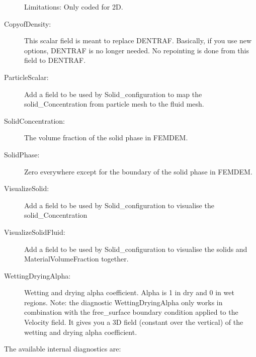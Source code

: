 \begin{description}
Limitations: Only coded for 2D.
\item[CopyofDensity:]This scalar field is meant to replace DENTRAF. Basically, if you use new options, DENTRAF is no longer needed. No repointing is done from this field to DENTRAF. 
\item[ParticleScalar:]Add a field to be used by Solid\_configuration to map the solid\_Concentration from particle mesh to the fluid mesh. 
\item[SolidConcentration:]The volume fraction of the solid phase in FEMDEM.
\item[SolidPhase:]Zero everywhere except for the boundary of the solid phase in FEMDEM.
\item[VisualizeSolid:]Add a field to be used by Solid\_configuration to visualise the solid\_Concentration 
\item[VisualizeSolidFluid:]Add a field to be used by Solid\_configuration to visualise the solids and MaterialVolumeFraction together.
\item[WettingDryingAlpha:]Wetting and drying alpha coefficient. Alpha is 1 in dry and 0 in wet regions. Note: the diagnostic WettingDryingAlpha only works in combination with the free\_surface boundary condition applied to the Velocity field. It gives you a 3D field (constant over the vertical) of the wetting and drying alpha coefficient.
\end{description}

The available internal   diagnostics are:


